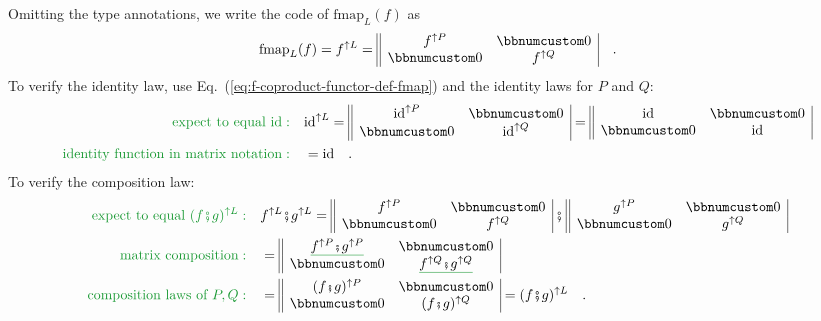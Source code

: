 Omitting the type annotations, we write the code of $\text{fmap}_{L}(f)$
as
\begin{equation}
\text{fmap}_{L}(f)=f^{\uparrow L}=\begin{array}{||cc|}
f^{\uparrow P} & \bbnum 0\\
\bbnum 0 & f^{\uparrow Q}
\end{array}\quad.\label{eq:f-coproduct-functor-def-fmap}
\end{equation}
To verify the identity law, use Eq.~(\ref{eq:f-coproduct-functor-def-fmap})
and the identity laws for $P$ and $Q$:
\begin{align*}
{\color{greenunder}\text{expect to equal }\text{id}:}\quad & \text{id}^{\uparrow L}=\begin{array}{||cc|}
\text{id}^{\uparrow P} & \bbnum 0\\
\bbnum 0 & \text{id}^{\uparrow Q}
\end{array}=\begin{array}{||cc|}
\text{id} & \bbnum 0\\
\bbnum 0 & \text{id}
\end{array}\\
{\color{greenunder}\text{identity function in matrix notation}:}\quad & =\text{id}\quad.
\end{align*}
To verify the composition law:
\begin{align*}
{\color{greenunder}\text{expect to equal }(f\bef g)^{\uparrow L}:}\quad & f^{\uparrow L}\bef g^{\uparrow L}=\begin{array}{||cc|}
f^{\uparrow P} & \bbnum 0\\
\bbnum 0 & f^{\uparrow Q}
\end{array}\,\bef\,\begin{array}{||cc|}
g^{\uparrow P} & \bbnum 0\\
\bbnum 0 & g^{\uparrow Q}
\end{array}\\
{\color{greenunder}\text{matrix composition}:}\quad & =\begin{array}{||cc|}
\gunderline{f^{\uparrow P}\bef g^{\uparrow P}} & \bbnum 0\\
\bbnum 0 & \gunderline{f^{\uparrow Q}\bef g^{\uparrow Q}}
\end{array}\\
{\color{greenunder}\text{composition laws of }P,Q:}\quad & =\begin{array}{||cc|}
(f\bef g)^{\uparrow P} & \bbnum 0\\
\bbnum 0 & (f\bef g)^{\uparrow Q}
\end{array}=(f\bef g)^{\uparrow L}\quad.
\end{align*}

